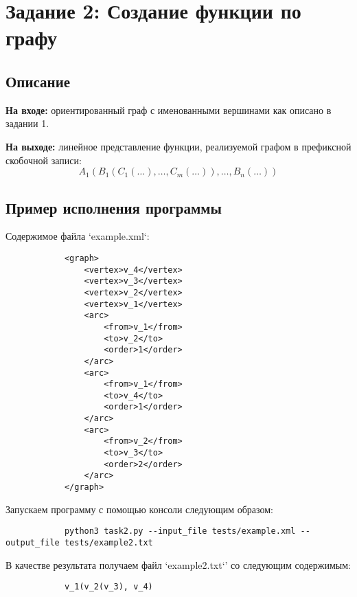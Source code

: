 \documentclass[bachelor, och, report]{shiza}
\begin{document}
\section{Задание 2: Создание функции по графу}
    \subsection{Описание}

        \textbf{На входе:} ориентированный граф с именованными вершинами как
        описано в задании 1.

        \textbf{На выходе:} линейное представление функции, реализуемой графом в
        префиксной скобочной записи: $$A_1(B_1(C_1(\dots), \dots, C_m(\dots)),
        \dots, B_n(\dots))$$

    \subsection{Пример исполнения программы}

    Содержимое файла `example.xml`:

        \begin{verbatim}
            <graph>
                <vertex>v_4</vertex>
                <vertex>v_3</vertex>
                <vertex>v_2</vertex>
                <vertex>v_1</vertex>
                <arc>
                    <from>v_1</from>
                    <to>v_2</to>
                    <order>1</order>
                </arc>
                <arc>
                    <from>v_1</from>
                    <to>v_4</to>
                    <order>1</order>
                </arc>
                <arc>
                    <from>v_2</from>
                    <to>v_3</to>
                    <order>2</order>
                </arc>
            </graph>      
        \end{verbatim}

        Запускаем программу с помощью консоли следующим образом:

        \begin{verbatim}
            python3 task2.py --input_file tests/example.xml --output_file tests/example2.txt
        \end{verbatim}

        В качестве результата получаем файл `example2.txt`' со следующим содержимым:

        \begin{verbatim}
            v_1(v_2(v_3), v_4)
        \end{verbatim}
\end{document}
